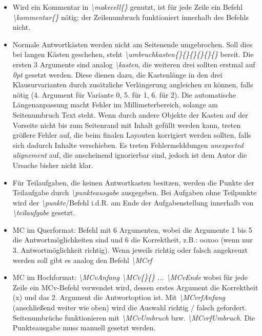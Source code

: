 \documentclass[./main.tex]{subfiles}
\begin{document}
\begin{itemize}
    \item Wird ein Kommentar in \textit{\textbackslash makecell\{\}} genutzt, ist f\"ur jede Zeile ein Befehl \textit{\textbackslash kommentar\{\}} n\"otig; der Zeilenumbruch funktioniert innerhalb des Befehls nicht.
    \item Normale Antwortk\"asten werden nicht am Seitenende umgebrochen. Soll dies bei langen K\"asten geschehen, steht \hypertarget{umbruchkasten}{\textit{\textbackslash umbruchkasten\{\}\{\}\{\}\{\}\{\}\{\}}} bereit. Die ersten 3 Argumente sind analog \textit{\textbackslash kasten}, die weiteren drei sollten erstmal auf \textit{0pt} gesetzt werden. Diese dienen dazu, die Kastenl\"ange in den drei Klausurvarianten durch zus\"atzliche Verl\"angerung angleichen zu k\"onnen, falls n\"otig (4. Argument f\"ur Variante 0, 5. f\"ur 1, 6. f\"ur 2). Die automatische L\"angenanpassung macht Fehler im Millimeterbereich, solange am Seitenumbruch Text steht. Wenn durch andere Objekte der Kasten auf der Vorseite nicht bis zum Seitenrand mit Inhalt gef\"ullt werden kann, treten gr\"o\ss{}ere Fehler auf, die beim finalen Layouten korrigiert werden sollten, falls sich dadurch Inhalte verschieben. Es treten Fehlermelddungen \textit{unexpected alignement} auf, die anscheinend ignorierbar sind, jedoch ist dem Autor die Ursache bisher nicht klar. 
    \item F\"ur Teilaufgaben, die keinen Antwortkasten besitzen, werden die Punkte der Teilaufgabe durch \hypertarget{punkteausgabe}{\textit{\textbackslash punkteausgabe}} ausgegeben. Bei Aufgaben ohne Teilpunkte wird der \textit{\textbackslash punkte}\-/Befehl i.d.R. am Ende der Aufgabenstellung innerhalb von \textit{\textbackslash teilaufgabe} gesetzt. 
    \item MC im Querformat: Befehl mit 6 Argumenten, wobei die Argumente 1 bis 5 die Antwortm\"oglichkeiten sind und 6 die Korrektheit, z.B.: ooxoo (wenn nur 3. Antwortm\"oglichkeit richtig). Wenn jeweils richtig oder falsch angekreuzt werden soll gibt es analog den Befehl \hypertarget{MCrf}{\textit{\textbackslash MCrf}}
    \item MC im Hochformat: \textit{\hypertarget{MCvAnfang}{\textbackslash MCvAnfang} \hypertarget{MCv}{\textbackslash MCv\{\}\{\}} ... \hypertarget{MCvEnde}{\textbackslash MCvEnde}} wobei f\"ur jede Zeile ein MCv-Befehl verwendet wird, dessen erstes Argument die Korrektheit (x) und das 2. Argument die Antwortoption ist. Mit \textit{\hypertarget{MCvrfAnfang}{\textbackslash MCvrfAnfang}} (anschlie\ss{}end weiter wie oben) wird die Auswahl richtig / falsch gefordert. Seitenumbr\"uche funktionieren mit \textit{\hypertarget{MCvUmbruch}{\textbackslash MCvUmbruch}} bzw. \textit{\hypertarget{MCvrfUmbruch}{\textbackslash MCvrfUmbruch}}. Die Punkteausgabe muss manuell gesetzt werden.

\end{itemize}
\end{document}
